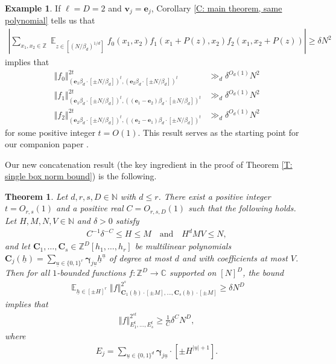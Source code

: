 \documentclass[11pt]{amsart}
\newtheorem{theorem}[lemma]{Theorem}
\theoremstyle{definition}
\newtheorem{example}[lemma]{Example} %
\DeclareMathOperator*{\E}{\mathbb{E}}
\newcommand{\C}{{\mathbb C}}
\newcommand{\N}{{\mathbb N}}
\newcommand{\Z}{{\mathbb Z}}
\newcommand{\bc}{{\mathbf{C}}}
\newcommand{\be}{{\mathbf{e}}}
\newcommand{\bv}{{\mathbf{v}}}
\newcommand{\bgamma}{{\boldsymbol{\gamma}}}
\newcommand{\uh}{{\underline{h}}}
\newcommand{\uu}{{\underline{u}}}
\newcommand{\norm}[1]{\left\Vert #1\right\Vert}
\newcommand{\abs}[1]{\mathopen{}\left| #1\mathclose{}\right|}
\begin{document}
\begin{example}
    If $\ell=D=2$ and $\bv_j = \be_j$, Corollary \ref{C: main theorem, same polynomial} tells us that
    \begin{align*}
        \abs{\sum_{x_1,x_2\in\Z}\E_{z\in[(N/\beta_d)^{1/d}]} f_0(x_1, x_2)f_1(x_1+P(z), x_2)f_2(x_1, x_2+P(z))}\geq \delta N^2
    \end{align*}
    implies that
    \begin{align*}
        \norm{f_0}_{(\be_1 \beta_d\cdot[\pm N/\beta_d])^t, (\be_2 \beta_d\cdot[\pm N/\beta_d])^t}^{2t}&\gg_{d}\delta^{O_{d}(1)}N^2\\
        \norm{f_1}_{(\be_1 \beta_d\cdot[\pm N/\beta_d])^t, ((\be_1-\be_2) \beta_d\cdot[\pm N/\beta_d])^t}^{2t}&\gg_{d}\delta^{O_{d}(1)}N^2\\
        \norm{f_2}_{(\be_2 \beta_d\cdot[\pm N/\beta_d])^t, ((\be_2-\be_1) \beta_d\cdot[\pm N/\beta_d])^t}^{2t}&\gg_{d}\delta^{O_{d}(1)}N^2
    \end{align*}
    for some positive integer $t=O(1)$.  This result serves as the starting point for our companion paper \cite{KKL24b}.
\end{example}





Our new concatenation result (the key ingredient in the proof of Theorem \ref{T: single box norm bound}) is the following.
\begin{theorem}\label{T: concatenation of polynomials}
Let $d, r,s,D \in \N$ with $d\leq r$.  There exist a positive integer $t=O_{r, s}(1)$ and a positive real $C=O_{r,s,D}(1)$ such that the following holds.  Let $H, M, N, V\in\N$ and $\delta>0$ satisfy
    \begin{align*}
        C^{-1}\delta^{-C}\leq H\leq M\quad \textrm{and}\quad H^d M V\leq N,
    \end{align*}
    and let $\bc_1, \ldots, \bc_s\in\Z^D[h_1, \ldots, h_r]$ be multilinear polynomials $\bc_j(\uh) = \sum\limits_{\uu\in\{0,1\}^r} \bgamma_{j\uu}\uh^\uu$ of degree at most $d$ and with coefficients at most $V$.  Then for all $1$-bounded functions $f:\Z^D\to\C$ supported on $[N]^D$, the bound
    \begin{align*}
        \E_{\uh\in[\pm H]^r}\norm{f}_{\bc_1(\uh)\cdot[\pm M], \ldots, \bc_s(\uh)\cdot[\pm M]}^{2^s}\geq \delta N^D
    \end{align*}
        implies that
    \begin{align*}
        \norm{f}_{E_1^{ t}, \ldots, E_s^{ t}}^{2^{st}}\geq \frac{1}{C}\delta^{C}N^{D},
    \end{align*}
    where
    \begin{align*}
        E_j = \sum_{\uu\in\{0,1\}^d}\bgamma_{j\uu}\cdot [\pm H^{|\uu|+1}].
    \end{align*} 
\end{theorem}
\end{document}
